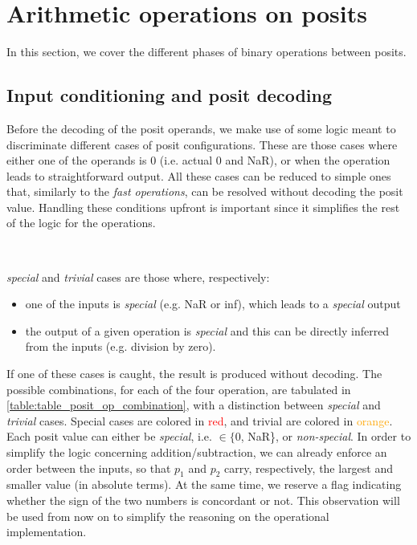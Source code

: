 \section{Arithmetic operations on posits}\label{sec:posit_ops}

In this section, we cover the different phases of binary operations between posits.

\subsection{Input conditioning and posit decoding}\label{input_conditioning_section}

Before the decoding of the posit operands, we make use of some logic meant to discriminate different cases of posit configurations. These are those cases where either one of the operands is $0$ (i.e. actual $0$ and NaR), or when the operation leads to straightforward output. All these cases can be reduced to simple ones that, similarly to the \textit{fast operations}, can be resolved without decoding the posit value. Handling these conditions upfront is important since it simplifies the rest of the logic for the operations.

\hypertarget{special_cases_link}{~}
\textit{special} and \textit{trivial} cases are those where, respectively:
\begin{itemize}
\item one of the inputs is \textit{special} (e.g. NaR or inf), which leads to a \textit{special} output
\item the output of a given operation is \textit{special} and this can be directly inferred from the inputs (e.g. division by zero).
\end{itemize}
If one of these cases is caught, the result is produced without decoding.
The possible combinations, for each of the four operation, are tabulated in \ref{table:table_posit_op_combination}, with a distinction between \textit{special} and \textit{trivial} cases.
Special cases are colored in \textcolor{red}{red}, and trivial are colored in \textcolor{orange}{orange}.
Each posit value can either be \textit{special}, i.e. $\in \{0$, \mbox{NaR}\}, or \textit{non-special}. 
In order to simplify the logic concerning addition/subtraction, we can already enforce an order between the inputs, so that $p_1$ and $p_2$ carry, respectively, the largest and smaller value (in absolute terms). At the same time, we reserve a flag indicating whether the sign of the two numbers is concordant or not. This observation will be used from now on to simplify the reasoning on the operational implementation.

